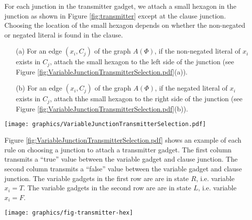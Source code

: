 For each junction in the transmitter gadget, we attach a small hexagon in the junction as shown in Figure \ref{fig:transmitter} except at the clause junction.
Choosing the location of the small hexagon depends on whether the non-negated or negated literal is found in the clause.
\begin{itemize}
\item[(a)]  For an edge $(x_i,C_j)$ of the graph $A(\Phi)$, if the non-negated literal of $x_i$ exists in $C_j$, attach the small hexagon to the left side of the junction (see Figure \ref{fig:VariableJunctionTransmitterSelection.pdf}(a)).
\item[(b)]  For an edge $(x_i,C_j)$ of the graph $A(\Phi)$, if the negated literal of $x_i$ exists in $C_j$, attach thhe small hexagon to the right side of the junction (see Figure \ref{fig:VariableJunctionTransmitterSelection.pdf}(b)).
\end{itemize}

\begin{minipage}{\linewidth}
\begin{center}
\texttt{[image: graphics/VariableJunctionTransmitterSelection.pdf]}
\label{fig:VariableJunctionTransmitterSelection.pdf}
\end{center}
\end{minipage} 

Figure \ref{fig:VariableJunctionTransmitterSelection.pdf} shows an example of each rule on choosing a junction to attach a transmitter gadget.
The first column transmits a ``true'' value between the variable gadget and clause junction.
The second column transmits a ``false'' value between the variable gadget and clause junction.
The variable gadgets in the first row are are in state $R$, i.e. variable $x_i = T$.
The variable gadgets in the second row are are in state $L$, i.e. variable $x_i = F$.

\begin{minipage}{\linewidth}
\begin{center}
	\texttt{[image: graphics/fig-transmitter-hex]}
	\label{fig:transmitter}
\end{center}
\end{minipage} 



